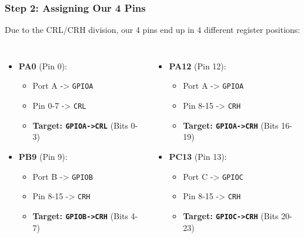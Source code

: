 \documentclass{beamer}
\begin{document}
\begin{frame}
	\frametitle{Step 2: Assigning Our 4 Pins}
	Due to the CRL/CRH division, our 4 pins end up in 4 different register positions:
	
	\bigskip
	\begin{columns}
		\begin{itemize}
			\item \textbf{PA0} (Pin 0):
			\begin{itemize}
				\item Port A -> \texttt{GPIOA}
				\item Pin 0-7 -> \texttt{CRL}
				\item \textbf{Target: \texttt{GPIOA->CRL}} (Bits 0-3)
			\end{itemize}
			\medskip
			\item \textbf{PB9} (Pin 9):
			\begin{itemize}
				\item Port B -> \texttt{GPIOB}
				\item Pin 8-15 -> \texttt{CRH}
				\item \textbf{Target: \texttt{GPIOB->CRH}} (Bits 4-7)
			\end{itemize}
		\end{itemize}
		
		\begin{itemize}
			\item \textbf{PA12} (Pin 12):
			\begin{itemize}
				\item Port A -> \texttt{GPIOA}
				\item Pin 8-15 -> \texttt{CRH}
				\item \textbf{Target: \texttt{GPIOA->CRH}} (Bits 16-19)
			\end{itemize}
			\medskip
			\item \textbf{PC13} (Pin 13):
			\begin{itemize}
				\item Port C -> \texttt{GPIOC}
				\item Pin 8-15 -> \texttt{CRH}
				\item \textbf{Target: \texttt{GPIOC->CRH}} (Bits 20-23)
			\end{itemize}
		\end{itemize}
	\end{columns}
\end{frame}
\end{document}
